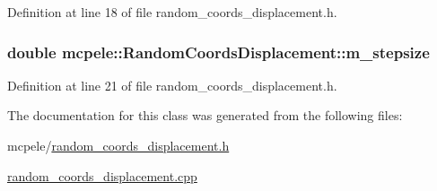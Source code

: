 \-Definition at line 18 of file random\-\_\-coords\-\_\-displacement.\-h.

\hypertarget{classmcpele_1_1RandomCoordsDisplacement_a523a1ff179209b62e574ebb3050f86a1}{
\subsubsection[{m\-\_\-stepsize}]{\setlength{\rightskip}{0pt plus 5cm}double {\bf mcpele\-::\-Random\-Coords\-Displacement\-::m\-\_\-stepsize}}}\label{classmcpele_1_1RandomCoordsDisplacement_a523a1ff179209b62e574ebb3050f86a1}


\-Definition at line 21 of file random\-\_\-coords\-\_\-displacement.\-h.



\-The documentation for this class was generated from the following files\-:\begin{DoxyCompactItemize}
\item 
mcpele/\hyperlink{random__coords__displacement_8h}{random\-\_\-coords\-\_\-displacement.\-h}\item 
\hyperlink{random__coords__displacement_8cpp}{random\-\_\-coords\-\_\-displacement.\-cpp}\end{DoxyCompactItemize}
